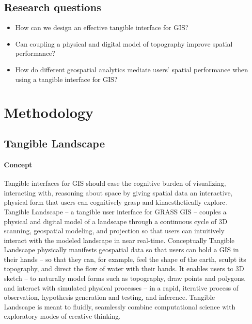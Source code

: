 \documentclass[prodmode,acmtochi]{acmsmall} %
\begin{document}
\subsection{Research questions}

\begin{itemize}
\item How can we design an effective tangible interface for GIS?
\item Can coupling a physical and digital model of topography improve spatial performance?
\item How do different geospatial analytics mediate users' spatial performance when using a tangible interface for GIS?
\end{itemize}

\section{Methodology}
\subsection{Tangible Landscape}

\paragraph{Concept}
%
Tangible interfaces for GIS 
should ease the cognitive burden of 
visualizing, interacting with, reasoning about space
by giving spatial data an interactive, physical form 
that users can cognitively grasp and kinaesthetically explore. 
%
Tangible Landscape -- a tangible user interface for GRASS GIS --
couples a physical and digital model of a landscape through a continuous cycle of 3D scanning, geospatial modeling, and projection
so that users can intuitively interact with the modeled landscape in near real-time.
%
Conceptually Tangible Landscape physically manifests geospatial data 
so that users can hold a GIS in their hands -- 
so that they can, for example, feel the shape of the earth, sculpt its topography, and direct the flow of water with their hands.
%
It enables users to 3D sketch -- 
to naturally model forms such as topography, 
draw points and polygons, 
and interact with simulated physical processes -- 
in a rapid, iterative process 
of observation, hypothesis generation and testing, and inference. 
%
Tangible Landscape is meant to fluidly, seamlessly combine
computational science with exploratory modes of creative thinking.
\end{document}
